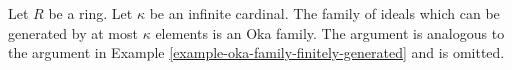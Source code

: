 \begin{example}
\label{example-oka-family-bound-cardinality}
Let $R$ be a ring.
Let $\kappa$ be an infinite cardinal.
The family of ideals which can be generated by at most $\kappa$ elements
is an Oka family. The argument is analogous to the argument in
Example \ref{example-oka-family-finitely-generated}
and is omitted.
\end{example}